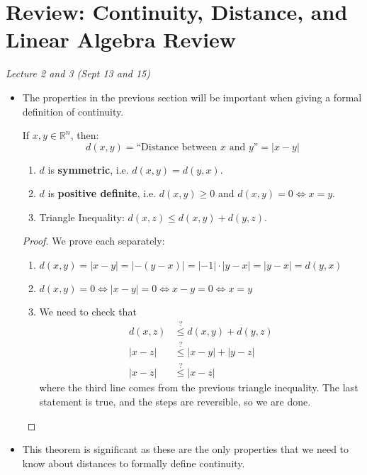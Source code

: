 \section{Review: Continuity, Distance, and Linear Algebra Review}
\textit{Lecture 2 and 3 (Sept 13 and 15)}
\begin{itemize}
    \item The properties in the previous section will be important when giving a formal definition of continuity.
    \begin{definition}
        If $x,y\in \mathbb{R}^n$, then:
        \begin{equation}
            d(x,y) = \text{``Distance between $x$ and $y$''} = |x-y|
        \end{equation}
    \end{definition}
    \begin{theorem}
        \begin{enumerate}
            \item $d$ is \textbf{symmetric}, i.e. $d(x,y)=d(y,x)$.
            \item $d$ is \textbf{positive definite}, i.e. $d(x,y) \ge 0$ and $d(x,y)=0 \iff x=y$.
            \item Triangle Inequality: $d(x,z) \le d(x,y) + d(y,z).$
        \end{enumerate}
    \end{theorem}
    \begin{proof}
        We prove each separately:
        \begin{enumerate}
            \item $d(x,y) = |x-y| = |-(y-x)| = |-1| \cdot |y-x| = |y-x| = d(y,x)$
            \item $d(x,y) = 0 \iff |x-y| = 0 \iff x-y = 0 \iff x=y$
            \item We need to check that
            \begin{align}
                d(x,z) &\stackrel{?}{\le} d(x,y) + d(y,z) \\ 
                |x-z| &\stackrel{?}{\le} |x-y| + |y-z| \\ 
                |x-z| &\stackrel{?}{\le} |x-z|
            \end{align}
            where the third line comes from the previous triangle inequality. The last statement is true, and the steps are reversible, so we are done.
        \end{enumerate}
    \end{proof}
    \item This theorem is significant as these are the only properties that we need to know about distances to formally define continuity.


\end{itemize}
